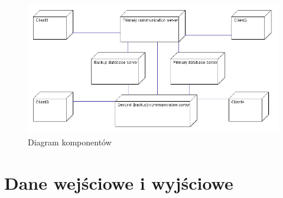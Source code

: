 \documentclass[12pt]{article}
\begin{document}
\begin{figure}[!ht]
  \centering
	\includegraphics[scale=0.60]{DeploymentDiagram}
  \caption{Diagram komponentów}
\end{figure}

\section{Dane wejściowe i wyjściowe}
\end{document}

